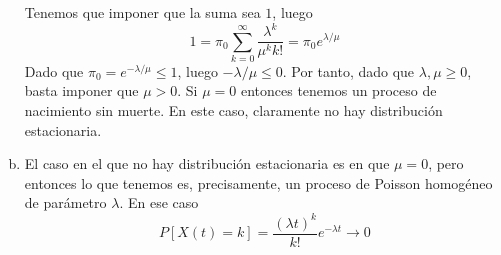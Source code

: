 \documentclass[twoside]{article}
\begin{document}
\begin{solucion}
\begin{enumerate}[a)]
$$$$
Tenemos que imponer que la suma sea $1$, luego
$$
1 =  \pi_0 \sum_{k=0}^\infty \frac{\lambda^k}{\mu^k k!} = \pi_0 e^{\lambda/\mu}
$$
Dado que $\pi_0  = e^{-\lambda / \mu}\leq 1$, luego $-\lambda/\mu \leq 0$. Por tanto, dado que $\lambda,\mu \geq 0$, basta imponer que $\mu >0$. Si $\mu = 0$ entonces tenemos un proceso de nacimiento sin muerte. En este caso, claramente no hay distribución estacionaria.
\item El caso en el que no hay distribución estacionaria es en que $\mu =0$, pero entonces lo que tenemos es, precisamente, un proceso de Poisson homogéneo de parámetro $\lambda$. En ese caso
$$
P[X(t)=k] = \frac{(\lambda t)^k}{k!}e^{-\lambda t} \rightarrow 0
$$

\end{enumerate}
\end{solucion}
\end{document}
